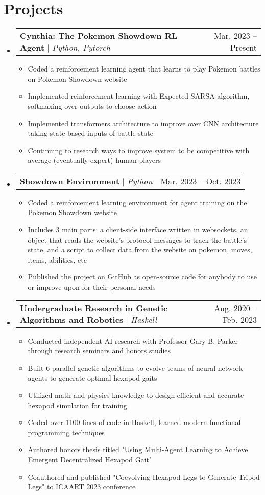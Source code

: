 \documentclass[letterpaper,11pt]{article}
\makeatletter
\newcommand{\resumeItem}[1]{
  \item\small{
    {#1 \vspace{-2pt}}
  }
}
\newcommand{\resumeProjectHeading}[2]{
    \item
    \begin{tabular*}{0.97\textwidth}{l@{\extracolsep{\fill}}r}
      #1 & #2 \\
    \end{tabular*}\vspace{-7pt}
}
\newcommand{\resumeSubHeadingListStart}{\begin{itemize}[leftmargin=0.15in, label={}]}
\newcommand{\resumeSubHeadingListEnd}{\end{itemize}}
\newcommand{\resumeItemListStart}{\begin{itemize}}
\newcommand{\resumeItemListEnd}{\end{itemize}\vspace{-5pt}}
\makeatother
\begin{document}
\section{Projects}
    \resumeSubHeadingListStart
      \resumeProjectHeading
          {\textbf{Cynthia: The Pokemon Showdown RL Agent} $|$ \emph{Python, Pytorch}}{Mar. 2023 -- Present}
          \resumeItemListStart
            \resumeItem{Coded a reinforcement learning agent that learns to play Pokemon battles on Pokemon Showdown website}
            \resumeItem{Implemented reinforcement learning with Expected SARSA algorithm, softmaxing over outputs to choose action}
            \resumeItem{Implemented transformers architecture to improve over CNN architecture taking state-based inputs of battle state}
            \resumeItem{Continuing to research ways to improve system to be competitive with average (eventually expert) human players}
          \resumeItemListEnd
      \resumeProjectHeading
          {\textbf{Showdown Environment} $|$ \emph{Python}}{Mar. 2023 -- Oct. 2023}
          \resumeItemListStart
            \resumeItem{Coded a reinforcement learning environment for agent training on the Pokemon Showdown website}
            \resumeItem{Includes 3 main parts: a client-side interface written in websockets, an object that reads the website's protocol messages to track the battle's state, and a script to collect data from the website on pokemon, moves, items, abilities, etc}
            \resumeItem{Published the project on GitHub as open-source code for anybody to use or improve upon for their personal needs}
          \resumeItemListEnd
      \resumeProjectHeading
          {\textbf{Undergraduate Research in Genetic Algorithms and Robotics} $|$ \emph{Haskell}}{Aug. 2020 -- Feb. 2023}
          \resumeItemListStart
            \resumeItem{Conducted independent AI research with Professor Gary B. Parker through research seminars and honors studies}
            \resumeItem{Built 6 parallel genetic algorithms to evolve teams of neural network agents to generate optimal hexapod gaits}
            \resumeItem{Utilized math and physics knowledge to design efficient and accurate hexapod simulation for training}
            \resumeItem{Coded over 1100 lines of code in Haskell, learned modern functional programming techniques}
            \resumeItem{Authored honors thesis titled "Using Multi-Agent Learning to Achieve Emergent Decentralized Hexapod Gait"}
            \resumeItem{Coauthored and published "Coevolving Hexapod Legs to Generate Tripod Legs" to ICAART 2023 conference}
          \resumeItemListEnd
    \resumeSubHeadingListEnd
\end{document}
